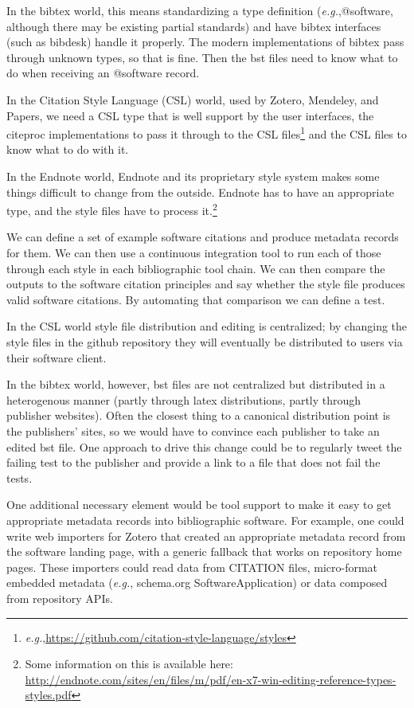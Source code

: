 \documentclass[a4paper,UKenglish]{dagman}
\newcommand{\eg}{\emph{e.g.},\xspace}
\begin{document}
In the bibtex world, this means standardizing a type definition (\eg @software, although there may be existing partial standards) and have bibtex interfaces (such as bibdesk) handle it properly. The modern implementations of bibtex pass through unknown types, so that is fine. Then the bst files need to know what to do when receiving an @software record.

In the Citation Style Language (CSL) world, used by Zotero, Mendeley, and Papers, we need a CSL type that is well support by the user interfaces, the citeproc implementations to pass it through to the CSL files\footnote{\eg \url{https://github.com/citation-style-language/styles}} and the CSL files to know what to do with it.

In the Endnote world, Endnote and its proprietary style system makes some things difficult to change from the outside. Endnote has to have an appropriate type, and the style files have to process it.\footnote{Some information on this is available here:\\ \url{http://endnote.com/sites/en/files/m/pdf/en-x7-win-editing-reference-types-styles.pdf}}

We can define a set of example software citations and produce metadata records for them. We can then use a continuous integration tool to run each of those through each style in each bibliographic tool chain. We can then compare the outputs to the software citation principles and say whether the style file produces valid software citations. By automating that comparison we can define a test.

In the CSL world style file distribution and editing is centralized; by changing the style files in the github repository they will eventually be distributed to users via their software client.

In the bibtex world, however, bst files are not centralized but distributed in a heterogenous manner (partly through latex distributions, partly through publisher websites). Often the closest thing to a canonical distribution point is the publishers' sites, so we would have to convince each publisher to take an edited bst file.  One approach to drive this change could be to regularly tweet the failing test to the publisher and provide a link to a file that does not fail the tests.

One additional necessary element would be tool support to make it easy to get appropriate metadata records into bibliographic software. For example, one could write web importers for Zotero that created an appropriate metadata record from the software landing page, with a generic fallback that works on repository home pages. These importers could read data from CITATION files, micro-format embedded metadata (\eg schema.org SoftwareApplication) or data composed from repository APIs.
\end{document}
